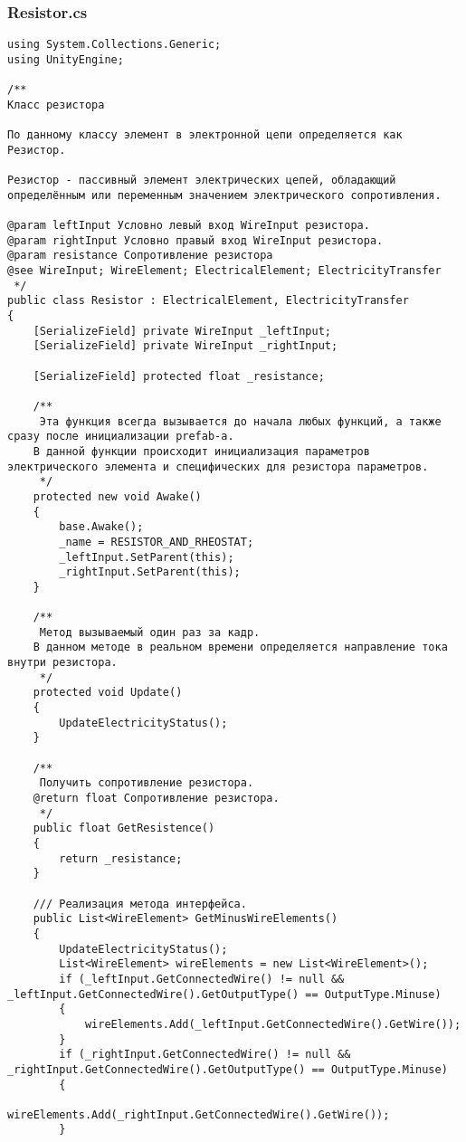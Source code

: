 \subsubsection*{Resistor.cs}
\begin{verbatim}
﻿using System.Collections.Generic;
using UnityEngine;

/**
Класс резистора

По данному классу элемент в электронной цепи определяется как Резистор.

Резистор - пассивный элемент электрических цепей, обладающий определённым или переменным значением электрического сопротивления.

@param leftInput Условно левый вход WireInput резистора.
@param rightInput Условно правый вход WireInput резистора.
@param resistance Сопротивление резистора
@see WireInput; WireElement; ElectricalElement; ElectricityTransfer
 */
public class Resistor : ElectricalElement, ElectricityTransfer
{
    [SerializeField] private WireInput _leftInput;
    [SerializeField] private WireInput _rightInput;

    [SerializeField] protected float _resistance;

    /**
     Эта функция всегда вызывается до начала любых функций, а также сразу после инициализации prefab-а.
    В данной функции происходит инициализация параметров электрического элемента и специфических для резистора параметров.
     */
    protected new void Awake()
    {
        base.Awake();
        _name = RESISTOR_AND_RHEOSTAT;
        _leftInput.SetParent(this);
        _rightInput.SetParent(this);
    }

    /**
     Метод вызываемый один раз за кадр.
    В данном методе в реальном времени определяется направление тока внутри резистора.
     */
    protected void Update()
    {
        UpdateElectricityStatus();
    }

    /**
     Получить сопротивление резистора.
    @return float Сопротивление резистора.
     */
    public float GetResistence()
    {
        return _resistance;
    }

    /// Реализация метода интерфейса.
    public List<WireElement> GetMinusWireElements()
    {
        UpdateElectricityStatus();
        List<WireElement> wireElements = new List<WireElement>();
        if (_leftInput.GetConnectedWire() != null && _leftInput.GetConnectedWire().GetOutputType() == OutputType.Minuse)
        {
            wireElements.Add(_leftInput.GetConnectedWire().GetWire());
        }
        if (_rightInput.GetConnectedWire() != null && _rightInput.GetConnectedWire().GetOutputType() == OutputType.Minuse)
        {
            wireElements.Add(_rightInput.GetConnectedWire().GetWire());
        }


\end{verbatim}
